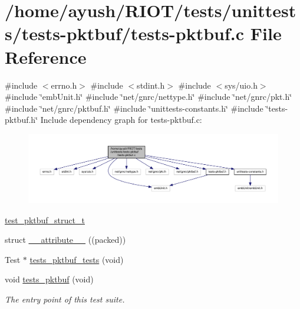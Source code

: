 \hypertarget{tests-pktbuf_8c}{}\section{/home/ayush/\+R\+I\+O\+T/tests/unittests/tests-\/pktbuf/tests-\/pktbuf.c File Reference}
\label{tests-pktbuf_8c}
{\ttfamily \#include $<$errno.\+h$>$}\newline
{\ttfamily \#include $<$stdint.\+h$>$}\newline
{\ttfamily \#include $<$sys/uio.\+h$>$}\newline
{\ttfamily \#include \char`\"{}emb\+Unit.\+h\char`\"{}}\newline
{\ttfamily \#include \char`\"{}net/gnrc/nettype.\+h\char`\"{}}\newline
{\ttfamily \#include \char`\"{}net/gnrc/pkt.\+h\char`\"{}}\newline
{\ttfamily \#include \char`\"{}net/gnrc/pktbuf.\+h\char`\"{}}\newline
{\ttfamily \#include \char`\"{}unittests-\/constants.\+h\char`\"{}}\newline
{\ttfamily \#include \char`\"{}tests-\/pktbuf.\+h\char`\"{}}\newline
Include dependency graph for tests-\/pktbuf.c\+:
\nopagebreak
\begin{figure}[H]
\begin{center}
\leavevmode
\includegraphics[width=350pt]{tests-pktbuf_8c__incl}
\end{center}
\end{figure}
\begin{DoxyCompactItemize}
\item 
\hyperlink{tests-pktbuf_8c_ad61c0402907f87c0096bcc8927e7d1de}{test\+\_\+pktbuf\+\_\+struct\+\_\+t}
\item 
struct \hyperlink{tests-pktbuf_8c_ab898071398b359603a35c202e9c65f3b}{\+\_\+\+\_\+attribute\+\_\+\+\_\+} ((packed))
\item 
Test $\ast$ \hyperlink{tests-pktbuf_8c_a00e3390935b3f1ed782d4db9907f7783}{tests\+\_\+pktbuf\+\_\+tests} (void)
\item 
void \hyperlink{group__unittests_gaa089380b8bfe478c2b7f3684af323767}{tests\+\_\+pktbuf} (void)
\begin{DoxyCompactList}\small\item\em The entry point of this test suite. \end{DoxyCompactList}\end{DoxyCompactItemize}


